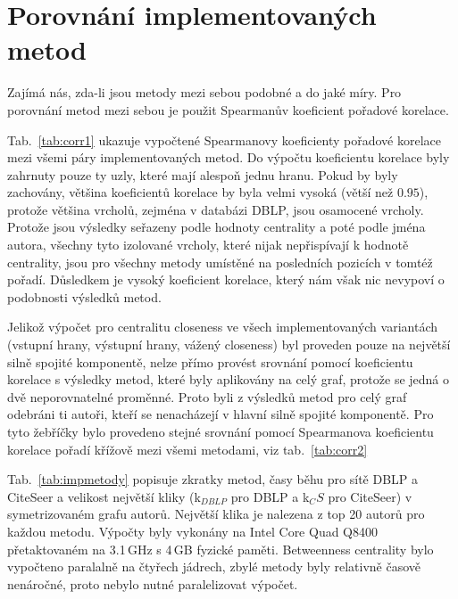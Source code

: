 \documentclass{bakalarka}
\begin{document}
\section{Porovnání implementovaných metod}
Zajímá nás, zda-li jsou metody mezi sebou podobné a do jaké míry. Pro porovnání
metod mezi sebou je použit Spearmanův koeficient pořadové korelace.


Tab.~\ref{tab:corr1} ukazuje vypočtené Spearmanovy koeficienty pořadové
korelace mezi všemi páry implementovaných metod. Do výpočtu koeficientu
korelace byly zahrnuty pouze ty uzly, které mají alespoň jednu hranu. Pokud by
byly zachovány, většina koeficientů korelace by byla velmi vysoká (větší než
$0.95$), protože většina vrcholů, zejména v databázi DBLP, jsou osamocené
vrcholy. Protože jsou výsledky seřazeny podle hodnoty centrality a poté podle
jména autora, všechny tyto izolované vrcholy, které nijak nepřispívají k
hodnotě centrality, jsou pro všechny metody umístěné na posledních pozicích v
tomtéž pořadí. Důsledkem je vysoký koeficient korelace, který nám však nic
nevypoví o podobnosti výsledků metod.

Jelikož výpočet pro centralitu closeness ve všech implementovaných variantách
(vstupní hrany, výstupní hrany, vážený closeness) byl proveden pouze na
největší silně spojité komponentě, nelze přímo provést srovnání pomocí
koeficientu korelace s výsledky metod, které byly aplikovány na celý graf,
protože se jedná o dvě neporovnatelné proměnné. Proto byli z výsledků metod pro
celý graf odebráni ti autoři, kteří se nenacházejí v hlavní silně spojité
komponentě. Pro tyto žebříčky bylo provedeno stejné srovnání pomocí Spearmanova
koeficientu korelace pořadí křížově mezi všemi metodami, viz tab.~\ref{tab:corr2}

Tab.~\ref{tab:impmetody} popisuje zkratky metod, časy běhu pro sítě DBLP a
CiteSeer a velikost největší kliky (k$_{DBLP}$ pro DBLP a k$_CS$ pro CiteSeer)
v symetrizovaném grafu autorů. Největší klika je nalezena z top 20 autorů pro
každou metodu. Výpočty byly vykonány na Intel\textregistered
Core Quad Q8400 přetaktovaném na 3.1\,GHz s 4\,GB fyzické
paměti. Betweenness centrality bylo vypočteno paralalně na čtyřech jádrech,
zbylé metody byly relativně časově nenáročné, proto nebylo nutné paralelizovat
výpočet.
\end{document}
